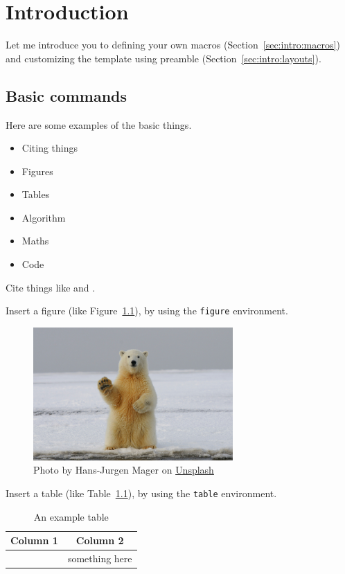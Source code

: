 \chapter{Introduction}\label{chapter:intro}
Let me introduce you to defining your own macros (Section~\ref{sec:intro:macros}) and customizing the template using preamble (Section~\ref{sec:intro:layouts}).


\section{Basic commands}

Here are some examples of the basic things.
\begin{itemize}
    \item Citing things
    \item Figures
    \item Tables
    \item Algorithm
    \item Maths
    \item Code
\end{itemize}

Cite things like \citet{adrian1979ConditionalEddiesIsotropic} and \citep{agostini2020ExplorationPredictionFluid}.

Insert a figure (like Figure~\ref{fig:example}), by using the \lstinline[language=tex]!figure! environment.
\begin{figure}[h]
    \centering
    \includegraphics[width=3in]{figs/example_image.jpg}
    \caption{
        Photo by Hans-Jurgen Mager on 
        \href{https://unsplash.com/photos/polar-bear-on-snow-covered-ground-during-daytime-qQWV91TTBrE?utm_content=creditCopyText&utm_medium=referral&utm_source=unsplash}{Unsplash}
    }\label{fig:example}
\end{figure}

Insert a table (like Table~\ref{tab:example}), by using the \lstinline[language=tex]!table! environment.
\begin{table}[h]
    \centering
    \caption{An example table}\label{tab:example}
    \begin{tabular}{|c|c|}
        \hline
        \textbf{Column 1} & \textbf{Column 2} \\
        \hline
         & something here \\
        \hline
    \end{tabular}
\end{table}

